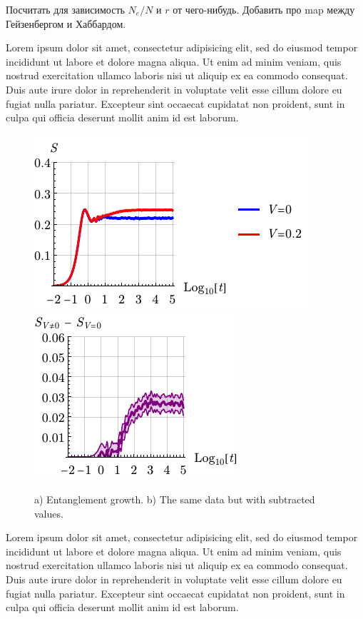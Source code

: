 Посчитать для зависимость $N_e/ N$ и $r$ от чего-нибудь. Добавить про map между Гейзенбергом и Хаббардом. 

\newpage

Lorem ipsum dolor sit amet, consectetur adipisicing elit, sed do eiusmod
tempor incididunt ut labore et dolore magna aliqua. Ut enim ad minim veniam,
quis nostrud exercitation ullamco laboris nisi ut aliquip ex ea commodo
consequat. Duis aute irure dolor in reprehenderit in voluptate velit esse
cillum dolore eu fugiat nulla pariatur. Excepteur sint occaecat cupidatat non
proident, sunt in culpa qui officia deserunt mollit anim id est laborum.

\begin{figure}[h]
    \centering
     \hspace{2 mm} 
    \includegraphics[align=c]{imgs/S_FV1.pdf}
    \hspace{10 mm} 
     \hspace{2 mm} 
    \includegraphics[align=c]{imgs/S_FV2.pdf}
    \caption{a) Entanglement growth. b) The same data but with subtracted values.}
\end{figure}

Lorem ipsum dolor sit amet, consectetur adipisicing elit, sed do eiusmod
tempor incididunt ut labore et dolore magna aliqua. Ut enim ad minim veniam,
quis nostrud exercitation ullamco laboris nisi ut aliquip ex ea commodo
consequat. Duis aute irure dolor in reprehenderit in voluptate velit esse
cillum dolore eu fugiat nulla pariatur. Excepteur sint occaecat cupidatat non
proident, sunt in culpa qui officia deserunt mollit anim id est laborum.


